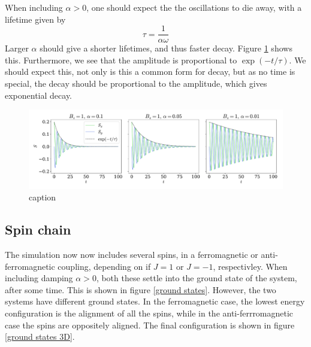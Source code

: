 \documentclass{article}
\begin{document}
    When including $\alpha > 0$, one should expect the the oscillations to die away, with a lifetime given by
    \begin{equation*}
        \tau = \frac{1}{\alpha \omega}
    \end{equation*}
    Larger $\alpha$ should give a shorter lifetimes, and thus faster decay. Figure \ref{decay} shows this. Furthermore, we see that the amplitude is proportional to $\exp(-t/\tau)$. We should expect this, not only is this a common form for decay, but as no time is special, the decay should be proportional to the amplitude, which gives exponential decay.

    \begin{figure}
        \centering
        \includegraphics[width=\textwidth]{../plots/decay_a.pdf}
        \caption{caption}
        \label{decay}
    \end{figure}

    \subsection*{Spin chain}
    The simulation now now includes several spins, in a ferromagnetic or anti-ferromagnetic coupling, depending on if $J = 1$ or $J = -1$, respectivley. When including damping $\alpha > 0$, both these settle into the ground state of the system, after some time. This is shown in figure \ref{ground states}. However, the two systems have different ground states. In the ferromagnetic case, the lowest energy configuration is the alignment of all the spins, while in the anti-ferrromagnetic case the spins are oppositely aligned. The final configuration is shown in figure \ref{ground states 3D}.
\end{document}
